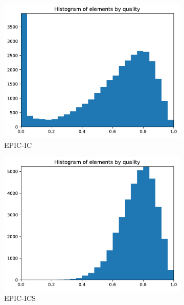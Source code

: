 \documentclass[3p,times,procedia,number]{elsarticle}
\begin{document}
\begin{figure}
\begin{subfigure}{.16\textwidth}
\centering
\includegraphics[width=\textwidth]{epic-ic-cube-cylinder-linear-quality.pdf}
\caption{EPIC-IC}
\end{subfigure}
\begin{subfigure}{.16\textwidth}
\centering
\includegraphics[width=\textwidth]{epic-ics-cube-cylinder-linear-quality.pdf}
\caption{EPIC-ICS}
\end{subfigure}
\begin{subfigure}{.16\textwidth}
\centering

\end{subfigure}
\end{figure}
\end{document}
